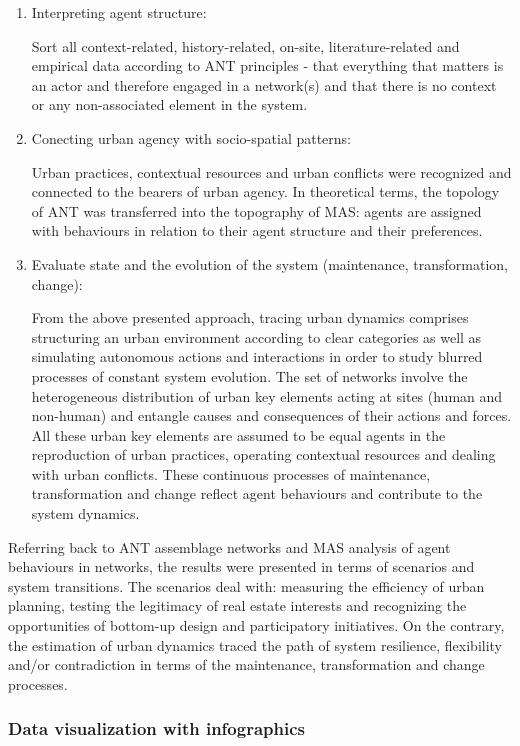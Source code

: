 \documentclass[11pt]{report}
\begin{document}
\begin{enumerate}
\item Interpreting agent structure:

Sort all context-related, history-related, on-site, literature-related and empirical data according to ANT principles - that everything that matters is an actor and therefore engaged in a network(s) and that there is no context or any non-associated element in the system. 

\item Conecting urban agency with socio-spatial patterns:

Urban practices, contextual resources and urban conflicts were recognized and connected to the bearers of urban agency.
In theoretical terms, the topology of ANT was transferred into the topography of MAS: agents are assigned with behaviours in relation to their agent structure and their preferences.

\item Evaluate state and the evolution of the system (maintenance, transformation, change):

From the above presented approach, tracing urban dynamics comprises structuring an urban environment according to clear categories as well as simulating autonomous actions and interactions in order to study blurred processes of constant system evolution.
The set of networks involve the heterogeneous distribution of urban key elements acting at sites (human and non-human) and entangle causes and consequences of their actions and forces.
All these urban key elements are assumed to be equal agents in the reproduction of urban practices, operating contextual resources and dealing with urban conflicts. These continuous processes of maintenance, transformation and change reflect agent behaviours and contribute to the system dynamics.
\end{enumerate}

Referring back to ANT assemblage networks and MAS analysis of agent behaviours in networks, the results were presented in terms of scenarios and system transitions. The scenarios deal with: measuring the efficiency of urban planning, testing the legitimacy of real estate interests and recognizing the opportunities of bottom-up design and participatory initiatives. On the contrary, the estimation of urban dynamics traced the path of system resilience, flexibility and/or contradiction in terms of the maintenance, transformation and change processes.

\subsubsection{Data visualization with infographics}
\end{document}
